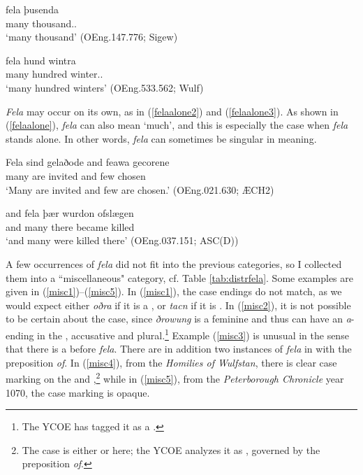 \documentclass[output=paper,colorlinks,citecolor=brown]{langscibook}
\begin{document}
\ea\label{numgen}
\gll fela þusenda\\
	many thousand.\GEN.\PL\\
\glt ‘many thousand’ (OEng.147.776; Sigew)
 \z

\ea\label{numcompgen}
\gll fela hund wintra\\
	many hundred winter.\GEN.\PL\\
\glt ‘many hundred winters’ (OEng.533.562; Wulf)
\z


\textit{Fela} may occur on its own, as in (\ref{felaalone2}) and (\ref{felaalone3}). As shown in (\ref{felaalone}), \textit{fela} can also mean ‘much’, and this is especially the case when \textit{fela} stands alone. In other words, \textit{fela} can sometimes be singular in meaning. 

\ea\label{felaalone2}
\gll Fela sind gelaðode and feawa gecorene\\	
	many are invited and few chosen\\
\glt ‘Many are invited and few are chosen.’ (OEng.021.630; ÆCH2)
\z

\ea\label{felaalone3}
\gll and fela þær wurdon ofslægen\\
	and many there became killed\\
\glt ‘and many were killed there’ (OEng.037.151; ASC(D))
\z

A few occurrences of \textit{fela} did not fit into the previous categories, so I collected them into a “miscellaneous" category, cf. Table \ref{tab:distrfela}. Some examples are given in (\ref{misc1})--(\ref{misc5}). In (\ref{misc1}), the case endings do not match, as we would expect either \textit{oðra} if it is a , or \textit{tacn} if it is . In (\ref{misc2}), it is not possible to be certain about the case, since \textit{ðrowung} is a feminine  and thus can have an \textit{a}-ending in the , accusative and  plural.\footnote{The YCOE  has tagged it as a .} Example (\ref{misc3}) is unusual in the sense that there is a  before \textit{fela}. There are in addition two instances of \textit{fela} in  with the preposition \textit{of}. In (\ref{misc4}), from the \textit{Homilies of Wulfstan}, there is clear case marking on the  and ,\footnote{The case is either  or  here; the YCOE  analyzes it as , governed by the preposition \textit{of}.} while in (\ref{misc5}), from the \textit{Peterborough Chronicle} year 1070, the case marking is opaque. 
\end{document}
